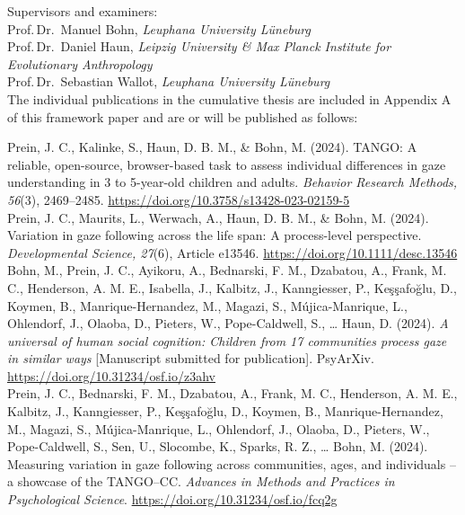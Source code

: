 \documentclass[
]{scrbook}
\begin{document}
\begin{titlepage}
\begin{flushleft}
\begin{normalsize}
            Supervisors and examiners: \\[5mm]
            \tabto*{5mm} Prof.\,Dr.\, Manuel Bohn, \textit{Leuphana University Lüneburg}\\
            \tabto*{5mm} Prof.\,Dr.\, Daniel Haun, \textit{Leipzig University \& Max Planck Institute for Evolutionary Anthropology}\\
                \tabto*{5mm} Prof.\,Dr.\, Sebastian Wallot, \textit{Leuphana University Lüneburg}\\[10mm]
                
                The individual publications in the cumulative thesis are included in Appendix A of this framework paper and are or will be published as follows: \\[5mm]
                
                \begin{hangparas}{5mm}{1}

Prein, J. C., Kalinke, S., Haun, D. B. M.\*, \& Bohn, M.\* (2024). TANGO: A reliable, open-source, browser-based task to assess individual differences in gaze understanding in 3 to 5-year-old children and adults. \textit{Behavior Research Methods, 56}(3), 2469–2485. \mbox{\url{https://doi.org/10.3758/s13428-023-02159-5}} \\[5mm]

Prein, J. C., Maurits, L., Werwach, A., Haun, D. B. M.,\* \& Bohn, M.\* (2024). Variation in gaze following across the life span: A process-level perspective. \textit{Developmental Science, 27}(6), Article e13546. \mbox{\url{https://doi.org/10.1111/desc.13546}} \\[5mm]

Bohn, M.\*, Prein, J. C.\*, Ayikoru, A., Bednarski, F. M., Dzabatou, A., Frank, M. C., Henderson, A. M. E., Isabella, J., Kalbitz, J., Kanngiesser, P., Keşşafoğlu, D., Koymen, B., Manrique-Hernandez, M., Magazi, S., Mújica-Manrique, L., Ohlendorf, J., Olaoba, D., Pieters, W., Pope-Caldwell, S., … Haun, D. (2024). \textit{A universal of human social cognition: Children from 17 communities process gaze in similar ways} [Manuscript submitted for publication]. PsyArXiv. \mbox{\url{https://doi.org/10.31234/osf.io/z3ahv}} \\[5mm]

Prein, J. C., Bednarski, F. M., Dzabatou, A., Frank, M. C., Henderson, A. M. E., Kalbitz, J., Kanngiesser, P., Keşşafoğlu, D., Koymen, B., Manrique-Hernandez, M., Magazi, S., Mújica-Manrique, L., Ohlendorf, J., Olaoba, D., Pieters, W., Pope-Caldwell, S., Sen, U., Slocombe, K., Sparks, R. Z., … Bohn, M. (2024). Measuring variation in gaze following across communities, ages, and individuals – a showcase of the TANGO–CC. \textit{Advances in Methods and Practices in Psychological Science}. \mbox{\url{https://doi.org/10.31234/osf.io/fcq2g}}

                \end{hangparas}
        \end{normalsize}
    \end{flushleft}
    
\end{titlepage}
\end{document}
